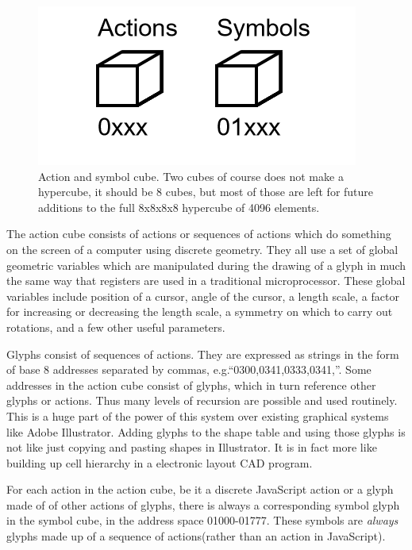 \documentclass[11pt]{article}
\begin{document}
\begin{figure}

\includegraphics[width=\linewidth]{figures/figure1_cubes.png}

\caption{Action and symbol cube. Two cubes of course does not make a hypercube, it should be 8 cubes, but most of those are left for future additions to the full 8x8x8x8 hypercube of 4096 elements.}
\end{figure}




    The action cube consists of actions or sequences of actions which do something on the screen of a computer using discrete geometry.  They all use a set of global geometric variables which are manipulated during the drawing of a glyph in much the same way that registers are used in a traditional microprocessor.  These global variables include position of a cursor, angle of the cursor, a length scale, a factor for increasing or decreasing the length scale, a symmetry on which to carry out rotations, and a few other useful parameters.   





    Glyphs consist of sequences of actions.  They are expressed as strings in the form of base 8 addresses separated by commas, e.g.``0300,0341,0333,0341,''.  Some addresses in the action cube consist of glyphs, which in turn reference other glyphs or actions.  Thus many levels of recursion are possible and used routinely.  This is a huge part of the power of this system over existing graphical systems like Adobe Illustrator.  Adding glyphs to the shape table and using those glyphs is not like just copying and pasting shapes in Illustrator.  It is in fact more like building up cell hierarchy in a electronic layout CAD program. 
    



    For each action in the action cube, be it a discrete JavaScript action or a glyph made of of other actions of glyphs, there is always a corresponding symbol glyph in the symbol cube, in the address space 01000-01777.  These symbols are \textit{
always} glyphs made up of a sequence of actions(rather than an action in JavaScript).  
\end{document}
